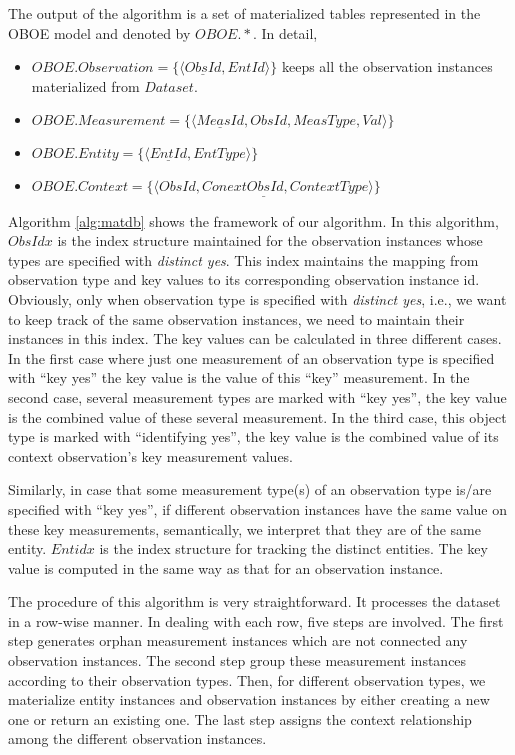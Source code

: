 \documentclass[10pt]{article}
\begin{document}
The output of the algorithm is a set of materialized tables represented in the OBOE model and denoted by $OBOE.*$. In detail,
\begin{itemize}
\item $OBOE.Observation=\{\langle \underline{ObsId}, EntId \rangle\}$ keeps all the observation instances materialized from $Dataset$.
\item $OBOE.Measurement=\{\langle \underline{MeasId}, ObsId, MeasType, Val\rangle\}$
\item $OBOE.Entity=\{\langle \underline{EntId}, EntType\rangle\}$
\item $OBOE.Context =\{\langle \underline{ObsId, ConextObsId, ContextType}\rangle\}$
\end{itemize}

Algorithm \ref{alg:matdb} shows the framework of our algorithm. 
In this algorithm, $ObsIdx$ is the index structure maintained for the observation instances 
whose types are specified with {\em distinct yes}. 
This index maintains the mapping from observation type and key values to its corresponding observation instance id. 
Obviously, only when observation type is specified with {\em distinct yes}, i.e., we want to keep track of the same observation instances, we need to maintain their instances in this index. 
The key values can be calculated in three different cases.
In the first case where just one measurement of an observation type is specified with ``key yes'' the key value is the value of this ``key'' measurement. In the second case, several measurement types are marked with ``key yes'', the key value is the combined value of these several measurement. In the third case, this object type is marked with ``identifying yes'', the key value is the combined value of its context observation's key measurement values. 

Similarly, in case that some measurement type(s) of an observation type is/are specified with ``key yes'', 
if different observation instances have the same value on these key measurements, semantically, we interpret that they are of the same entity. $Entidx$ is the index structure for tracking the distinct entities. 
The key value is computed in the same way as that for an observation instance.

The procedure of this algorithm is very straightforward. 
It processes the dataset in a row-wise manner. 
In dealing with each row, five steps are involved. 
The first step generates orphan measurement instances which are not connected any observation instances.
The second step group these measurement instances according to their observation types.
Then, for different observation types, we materialize entity instances and observation instances by either creating a new one or return an existing one. The last step assigns the context relationship among the different observation instances. 
\end{document}
